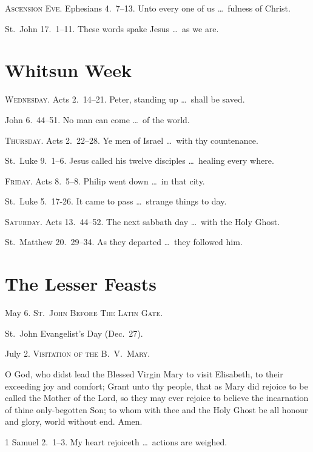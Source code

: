 {\scshape Ascension Eve.}  Ephesians 4.~7–13.   Unto every one of us \ldots\ fulness of Christ.

 St.~John 17.~1–11.   These words spake Jesus \ldots\ as we are.

\section{Whitsun Week}

{\scshape Wednesday.}  Acts 2.~14–21.   Peter, standing up \ldots\ shall be saved.

 John 6.~44–51.   No man can come \ldots\ of the world.

{\scshape Thursday.}  Acts 2.~22–28.   Ye men of Israel \ldots\ with thy countenance.

 St.~Luke 9.~1–6.   Jesus called his twelve disciples \ldots\ healing every where.

{\scshape Friday.}  Acts 8.~5–8.   Philip went down \ldots\ in that city.

 St.~Luke 5.~17-26.   It came to pass \ldots\ strange things to day.

{\scshape Saturday.}  Acts 13.~44–52.   The next sabbath day \ldots\ with the Holy Ghost.

 St.~Matthew 20.~29–34.   As they departed \ldots\ they followed him.


\section{The Lesser Feasts}

\noindent May 6. {\scshape St.~John Before The Latin Gate.} 

 St.~John Evangelist’s Day (Dec.~27).

\medskip

\noindent July 2. {\scshape Visitation of the B.~V.~Mary.}

 O God, who didst lead the Blessed Virgin Mary to visit Elisabeth, to their exceeding joy and comfort; Grant unto thy people, that as Mary did rejoice to be called the Mother of the Lord, so they may ever rejoice to believe the incarnation of thine only-begotten Son; to whom with thee and the Holy Ghost be all honour and glory, world without end. \R Amen.
    
 1 Samuel 2.~1–3.   My heart rejoiceth \ldots\ actions are weighed.

